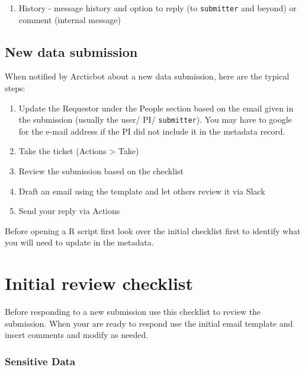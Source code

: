 \documentclass[
  letterpaper,
  DIV=11,
  numbers=noendperiod]{scrreprt}
\providecommand{\tightlist}{%
  \setlength{\itemsep}{0pt}\setlength{\parskip}{0pt}}\usepackage{longtable,booktabs,array}
\begin{document}
\begin{enumerate}
\def\labelenumi{\arabic{enumi}.}
\setcounter{enumi}{7}
\tightlist
\item
  History - message history and option to reply (to \texttt{submitter}
  and beyond) or comment (internal message)
\end{enumerate}

\hypertarget{new-data-submission}{%
\subsection{New data submission}\label{new-data-submission}}

When notified by Arcticbot about a new data submission, here are the
typical steps:

\begin{enumerate}
\def\labelenumi{\arabic{enumi}.}
\tightlist
\item
  Update the Requestor under the People section based on the email given
  in the submission (usually the user/ PI/ \texttt{submitter}). You may
  have to google for the e-mail address if the PI did not include it in
  the metadata record.
\item
  Take the ticket (Actions \textgreater{} Take)
\item
  Review the submission based on the checklist
\item
  Draft an email using the template and let others review it via Slack
\item
  Send your reply via Actions
\end{enumerate}

Before opening a R script first look over the initial checklist first to
identify what you will need to update in the metadata.

\hypertarget{initial-review-checklist}{%
\section{Initial review checklist}\label{initial-review-checklist}}

Before responding to a new submission use this checklist to review the
submission. When your are ready to respond use the initial email
template and insert comments and modify as needed.

\hypertarget{sensitive-data}{%
\subsubsection{Sensitive Data}\label{sensitive-data}}
\end{document}
